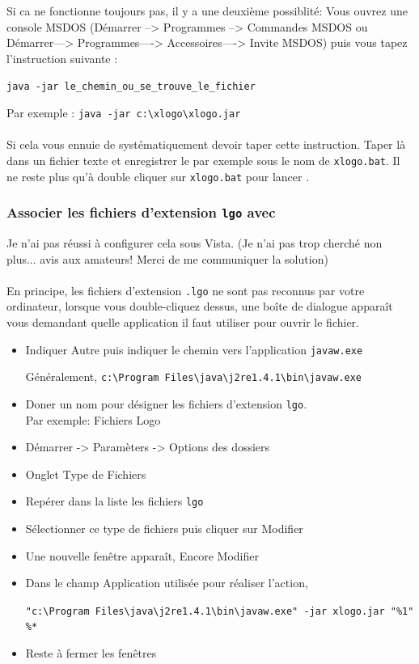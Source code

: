  Si ca ne fonctionne toujours pas, il y a une deuxième possiblité: Vous ouvrez une console MSDOS (Démarrer –> Programmes –> Commandes MSDOS ou Démarrer—> Programmes—-> Accessoires—-> Invite MSDOS) puis vous tapez l’instruction suivante :
\begin{center}
 \texttt{java -jar le\_chemin\_ou\_se\_trouve\_le\_fichier}
\end{center}
Par exemple : \texttt{java -jar c:\textbackslash xlogo\textbackslash xlogo.jar}\\ \\
    Si cela vous ennuie de systématiquement devoir taper cette instruction. Taper là dans un fichier texte et
enregistrer le par exemple sous le nom de \texttt{xlogo.bat}. Il ne reste plus qu'à double cliquer sur \texttt{xlogo.bat} pour lancer \xlogo.

\subsubsection*{Associer les fichiers d'extension \texttt{lgo} avec \xlogo}
Je n'ai pas réussi à configurer cela sous Vista. (Je n'ai pas trop cherché non plus... avis aux amateurs! Merci de me communiquer la solution)\\ \\
     En principe, les fichiers d'extension \texttt{.lgo} ne sont pas reconnus par votre ordinateur, lorsque vous double-cliquez
dessus, une boîte de dialogue apparaît vous demandant quelle application il faut utiliser pour ouvrir le fichier.
\begin{itemize}
 \item  Indiquer \og Autre \fg puis indiquer le chemin vers l’application \texttt{javaw.exe}
\begin{center}
 Généralement, \texttt{c:\textbackslash Program Files\textbackslash java\textbackslash j2re1.4.1\textbackslash bin\textbackslash javaw.exe}
\end{center}
\item Doner un nom pour désigner les fichiers d'extension \texttt{lgo}.\\
Par exemple: Fichiers Logo
\item Démarrer -> Paramèters -> Options des dossiers
\item Onglet \og Type de Fichiers \fg
\item Repérer dans la liste les fichiers \texttt{lgo}
\item Sélectionner ce type de fichiers puis cliquer sur \og Modifier\fg
\item Une nouvelle fenêtre apparaît, Encore \og Modifier\fg
\item Dans le champ \og Application utilisée pour réaliser l'action\fg,
\begin{center}
\texttt{"c:\textbackslash Program Files\textbackslash java\textbackslash j2re1.4.1\textbackslash bin\textbackslash javaw.exe" -jar xlogo.jar "\%1" \%*}
\end{center} 
\item Reste à fermer les fenêtres
\end{itemize}
